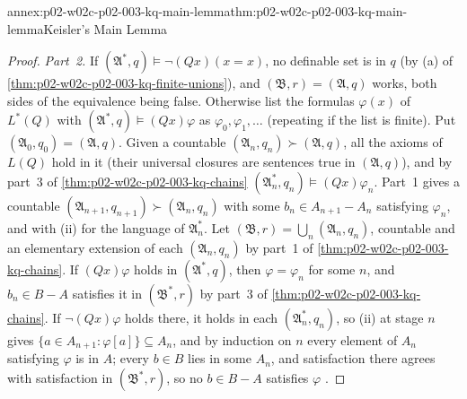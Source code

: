 \begin{annexitem}{annex:p02-w02c-p02-003-kq-main-lemma}{thm:p02-w02c-p02-003-kq-main-lemma}{Keisler's Main Lemma}
\begin{proof}
\emph{Part~2.}  If \((\mathfrak A^{*},q)\models\neg(Qx)(x=x)\), no
definable set is in \(q\) (by (a) of
\cref{thm:p02-w02c-p02-003-kq-finite-unions}), and
\((\mathfrak B,r)=(\mathfrak A,q)\) works, both sides of the equivalence
being false.  Otherwise list the formulas \(\varphi(x)\) of \(L^{*}(Q)\)
with \((\mathfrak A^{*},q)\models(Qx)\varphi\) as \(\varphi_0,\varphi_1,\ldots\)
(repeating if the list is finite).  Put \((\mathfrak A_0,q_0)=(\mathfrak
A,q)\).  Given a countable \((\mathfrak A_n,q_n)\succ(\mathfrak A,q)\), all
the axioms of \(L(Q)\) hold in it (their universal closures are sentences
true in \((\mathfrak A,q)\)), and by part~3 of
\cref{thm:p02-w02c-p02-003-kq-chains} \((\mathfrak A_n^{*},q_n)\models
(Qx)\varphi_n\).  Part~1 gives a countable \((\mathfrak A_{n+1},q_{n+1})\succ
(\mathfrak A_n,q_n)\) with some \(b_n\in A_{n+1}-A_n\) satisfying
\(\varphi_n\), and with (ii) for the language of \(\mathfrak A_n^{*}\).  Let
\((\mathfrak B,r)=\bigcup_n(\mathfrak A_n,q_n)\), countable and an
elementary extension of each \((\mathfrak A_n,q_n)\) by part~1 of
\cref{thm:p02-w02c-p02-003-kq-chains}.  If \((Qx)\varphi\) holds in
\((\mathfrak A^{*},q)\), then \(\varphi=\varphi_n\) for some \(n\), and
\(b_n\in B-A\) satisfies it in \((\mathfrak B^{*},r)\) by part~3 of
\cref{thm:p02-w02c-p02-003-kq-chains}.  If \(\neg(Qx)\varphi\) holds there,
it holds in each \((\mathfrak A_n^{*},q_n)\), so (ii) at stage \(n\) gives
\(\{a\in A_{n+1}:\varphi[a]\}\subseteq A_n\), and by induction on \(n\)
every element of \(A_n\) satisfying \(\varphi\) is in \(A\); every \(b\in B\)
lies in some \(A_n\), and satisfaction there agrees with satisfaction in
\((\mathfrak B^{*},r)\), so no \(b\in B-A\) satisfies \(\varphi\)
\cite[\S2, Lemma~2.8, pp.~23--24]{Keisler1970}.
\end{proof}
\end{annexitem}

